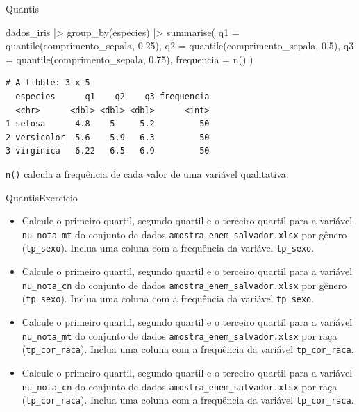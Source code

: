 \documentclass[
  10pt,
  ignorenonframetext,
]{beamer}
\newenvironment{Shaded}{\begin{snugshade}}{\end{snugshade}}
\newcommand{\AttributeTok}[1]{\textcolor[rgb]{0.40,0.45,0.13}{#1}}
\newcommand{\FloatTok}[1]{\textcolor[rgb]{0.68,0.00,0.00}{#1}}
\newcommand{\FunctionTok}[1]{\textcolor[rgb]{0.28,0.35,0.67}{#1}}
\newcommand{\NormalTok}[1]{\textcolor[rgb]{0.00,0.23,0.31}{#1}}
\newcommand{\SpecialCharTok}[1]{\textcolor[rgb]{0.37,0.37,0.37}{#1}}
\providecommand{\tightlist}{%
  \setlength{\itemsep}{0pt}\setlength{\parskip}{0pt}}\usepackage{longtable,booktabs,array}
\begin{document}
\begin{frame}[fragile]{Quantis}
\protect\hypertarget{quantis-7}{}
\begin{Shaded}
\begin{Highlighting}[]
\NormalTok{dados\_iris }\SpecialCharTok{|\textgreater{}}
  \FunctionTok{group\_by}\NormalTok{(especies) }\SpecialCharTok{|\textgreater{}}
  \FunctionTok{summarise}\NormalTok{(}
    \AttributeTok{q1 =} \FunctionTok{quantile}\NormalTok{(comprimento\_sepala, }\FloatTok{0.25}\NormalTok{),}
    \AttributeTok{q2 =} \FunctionTok{quantile}\NormalTok{(comprimento\_sepala, }\FloatTok{0.5}\NormalTok{),}
    \AttributeTok{q3 =} \FunctionTok{quantile}\NormalTok{(comprimento\_sepala, }\FloatTok{0.75}\NormalTok{),}
    \AttributeTok{frequencia =} \FunctionTok{n}\NormalTok{()}
\NormalTok{  )}
\end{Highlighting}
\end{Shaded}

\begin{verbatim}
# A tibble: 3 x 5
  especies      q1    q2    q3 frequencia
  <chr>      <dbl> <dbl> <dbl>      <int>
1 setosa      4.8    5     5.2         50
2 versicolor  5.6    5.9   6.3         50
3 virginica   6.22   6.5   6.9         50
\end{verbatim}

\texttt{n()} calcula a frequência de cada valor de uma variável
qualitativa.
\end{frame}

\begin{frame}[fragile]{Quantis\newline Exercício}
\protect\hypertarget{quantisexercuxedcio}{}
\begin{itemize}
\tightlist
\item
  Calcule o primeiro quartil, segundo quartil e o terceiro quartil para
  a variável \texttt{nu\_nota\_mt} do conjunto de dados
  \texttt{amostra\_enem\_salvador.xlsx} por gênero (\texttt{tp\_sexo}).
  Inclua uma coluna com a frequência da variável \texttt{tp\_sexo}.
\item
  Calcule o primeiro quartil, segundo quartil e o terceiro quartil para
  a variável \texttt{nu\_nota\_cn} do conjunto de dados
  \texttt{amostra\_enem\_salvador.xlsx} por gênero (\texttt{tp\_sexo}).
  Inclua uma coluna com a frequência da variável \texttt{tp\_sexo}.
\item
  Calcule o primeiro quartil, segundo quartil e o terceiro quartil para
  a variável \texttt{nu\_nota\_mt} do conjunto de dados
  \texttt{amostra\_enem\_salvador.xlsx} por raça
  (\texttt{tp\_cor\_raca}). Inclua uma coluna com a frequência da
  variável \texttt{tp\_cor\_raca}.
\item
  Calcule o primeiro quartil, segundo quartil e o terceiro quartil para
  a variável \texttt{nu\_nota\_cn} do conjunto de dados
  \texttt{amostra\_enem\_salvador.xlsx} por raça
  (\texttt{tp\_cor\_raca}). Inclua uma coluna com a frequência da
  variável \texttt{tp\_cor\_raca}.
\end{itemize}
\end{frame}
\end{document}
